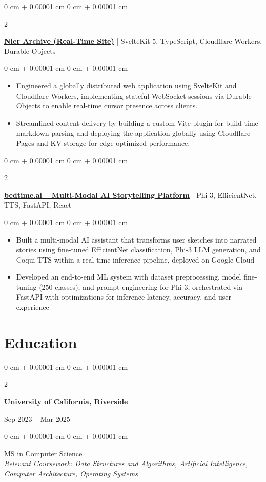 \documentclass[10pt, letterpaper]{article}
\newenvironment{highlights}{
    \begin{itemize}[
        topsep=0.10 cm,
        parsep=0.10 cm,
        partopsep=0pt,
        itemsep=0pt,
        leftmargin=0 cm + 10pt
    ]
}{
    \end{itemize}
} %
\newenvironment{onecolentry}{
    \begin{adjustwidth}{
        0 cm + 0.00001 cm
    }{
        0 cm + 0.00001 cm
    }
}{
    \end{adjustwidth}
} %
\newenvironment{twocolentry}[2][]{
    \onecolentry
    \def\secondColumn{#2}
    \setcolumnwidth{\fill, 4.5 cm}
    \begin{paracol}{2}
}{
    \switchcolumn \raggedleft \secondColumn
    \end{paracol}
    \endonecolentry
} %
\renewenvironment{highlights}{
    \begin{itemize}[
        topsep=0.05cm,
        parsep=0.10cm,
        partopsep=1pt,
        itemsep=0pt,
        leftmargin=0cm + 10pt
    ]
}{
    \end{itemize}
}
\begin{document}
\begin{twocolentry}{2026}
\textbf{\href{https://github.com/notquite28/nier-archive-site}{Nier Archive (Real-Time Site)}} | SvelteKit 5, TypeScript, Cloudflare Workers, Durable Objects
\end{twocolentry}
\vspace{0.05cm}
\begin{onecolentry}
\begin{highlights}
\item Engineered a globally distributed web application using SvelteKit and Cloudflare Workers, implementing stateful WebSocket sessions via Durable Objects to enable real-time cursor presence across clients.
\item Streamlined content delivery by building a custom Vite plugin for build-time markdown parsing and deploying the application globally using Cloudflare Pages and KV storage for edge-optimized performance.
\end{highlights}
\end{onecolentry}
\vspace{0.3cm}
\begin{twocolentry}{2025}
\textbf{\href{https://github.com/notquite28/bedtime.ai}{bedtime.ai – Multi-Modal AI Storytelling Platform}} |  Phi-3, EfficientNet, TTS, FastAPI, React
\end{twocolentry}
\vspace{0.05cm}
\begin{onecolentry}
\begin{highlights}
\item Built a multi-modal AI assistant that transforms user sketches into narrated stories using fine-tuned EfficientNet classification, Phi-3 LLM generation, and Coqui TTS within a real-time inference pipeline, deployed on Google Cloud
\item Developed an end-to-end ML system with dataset preprocessing, model fine-tuning (250 classes), and prompt engineering for Phi-3, orchestrated via FastAPI with optimizations for inference latency, accuracy, and user experience
\end{highlights}
\end{onecolentry}

\section{Education}

\begin{twocolentry}{Sep 2023 – Mar 2025}
\textbf{University of California, Riverside}
\end{twocolentry}
\vspace{0.05cm}
\begin{onecolentry}
MS in Computer Science \\
\textit{Relevant Coursework: Data Structures and Algorithms, Artificial Intelligence, Computer Architecture, Operating Systems}
\end{onecolentry}

\vspace{0.15cm}

\end{document}
